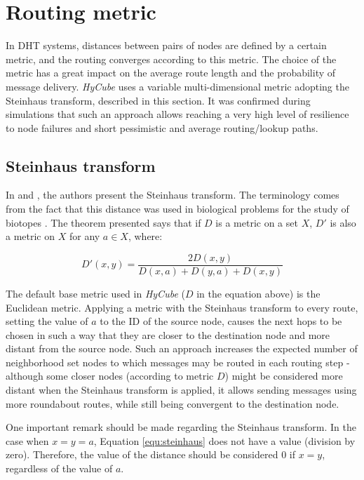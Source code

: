 \section{Routing metric}
\label{sec:metric}

In DHT systems, distances between pairs of nodes are defined by a certain metric, and the routing converges according to this metric. The choice of the metric has a great impact on the average route length and the probability of message delivery. \emph{HyCube} uses a variable multi-dimensional metric adopting the Steinhaus transform, described in this section. It was confirmed during simulations that such an approach allows reaching a very high level of resilience to node failures and short pessimistic and average routing/lookup paths.




\subsection{Steinhaus transform}
\label{sec:steinhaus}

In \cite{nearNeighSearchMetrSpDim} and \cite{geomCutsMetrics}, the authors present the Steinhaus transform. The terminology comes from the fact that this distance was used in biological problems for the study of biotopes \cite{certDistSetsCorrDistOfFunc}. The theorem presented says that if $D$ is a metric on a set $X$, $D'$ is also a metric on $X$ for any $a \in X$, where:

\begin{equation}
\label{equ:steinhaus}
D'(x,y) = \frac{2D(x,y)}{D(x,a) + D(y,a) + D(x,y)}
\end{equation}

The default base metric used in \emph{HyCube} ($D$ in the equation above) is the Euclidean metric. Applying a metric with the Steinhaus transform to every route, setting the value of $a$ to the ID of the source node, causes the next hops to be chosen in such a way that they are closer to the destination node and more distant from the source node. Such an approach increases the expected number of neighborhood set nodes to which messages may be routed in each routing step - although some closer nodes (according to metric $D$) might be considered more distant when the Steinhaus transform is applied, it allows sending messages using more roundabout routes, while still being convergent to the destination node.

One important remark should be made regarding the Steinhaus transform. In the case when $x = y = a$, Equation \ref{equ:steinhaus} does not have a value (division by zero). Therefore, the value of the distance should be considered 0 if $x = y$, regardless of the value of $a$.



